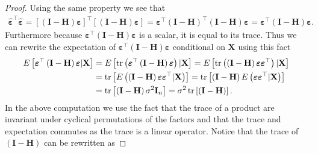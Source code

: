 \begin{proof}
    Using the same property we see that
    \begin{align*}
        \boldsymbol{\hat{\varepsilon}}^\top\boldsymbol{\hat{\varepsilon}} = \left[  \left(\mathbf{I} - \mathbf{H}\right)\boldsymbol{\varepsilon} \right]^\top\left[ \left(\mathbf{I} - \mathbf{H}\right)\boldsymbol{\varepsilon} \right] = \boldsymbol{\varepsilon}^\top\left(\mathbf{I} - \mathbf{H}\right)^\top \left(\mathbf{I} - \mathbf{H}\right)\boldsymbol{\varepsilon} = \boldsymbol{\varepsilon}^\top \left(\mathbf{I} - \mathbf{H}\right)\boldsymbol{\varepsilon}.
    \end{align*}
    Furthermore because $\boldsymbol{\varepsilon}^\top \left(\mathbf{I} - \mathbf{H}\right)\boldsymbol{\varepsilon}$ is a scalar, it is equal to its trace.
    Thus we can rewrite the expectation of $\boldsymbol{\varepsilon}^\top \left(\mathbf{I} - \mathbf{H}\right)\boldsymbol{\varepsilon}$ conditional on $\mathbf{X}$ using this fact
    \begin{align}
        E\left[\boldsymbol{\varepsilon}^\top \left(\mathbf{I} - \mathbf{H}\right)\boldsymbol{\varepsilon}|\mathbf{X}\right] &= E\left[\operatorname{\text{tr}}\left(\boldsymbol{\varepsilon}^\top \left(\mathbf{I} - \mathbf{H}\right)\boldsymbol{\varepsilon}\right)|\mathbf{X}\right] 
        = E\left[\operatorname{\text{tr}}\left(\left(\mathbf{I} - \mathbf{H}\right)\boldsymbol{\varepsilon}\boldsymbol{\varepsilon}^\top\right)|\mathbf{X}\right] \nonumber\\
        &= \operatorname{\text{tr}}\left[E\left(\left(\mathbf{I} - \mathbf{H}\right)\boldsymbol{\varepsilon}\boldsymbol{\varepsilon}^\top|\mathbf{X}\right)\right] 
        = \operatorname{\text{tr}}\left[\left(\mathbf{I} - \mathbf{H}\right)E\left(\boldsymbol{\varepsilon}\boldsymbol{\varepsilon}^\top|\mathbf{X}\right)\right] \nonumber\\
        &= \operatorname{\text{tr}}\left[\left(\mathbf{I} - \mathbf{H}\right)\sigma^2\mathbf{I}_{n}\right]
        = \sigma^2\operatorname{\text{tr}}\left[\left(\mathbf{I} - \mathbf{H}\right)\right]. \label{eq:trace_projection_matrix}
    \end{align}
    In the above computation we use the fact that the trace of a product are invariant under cyclical permutations of the factors and that the trace and expectation commutes as the trace is a linear operator. 
    Notice that the trace of $\left(\mathbf{I} - \mathbf{H}\right)$ can be rewritten as

\end{proof}

